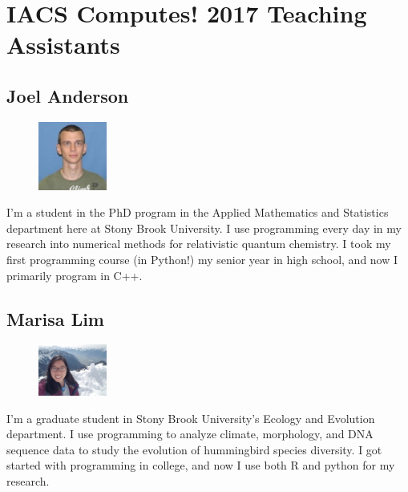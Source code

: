 \documentclass[]{article}
\begin{document}
\section*{IACS Computes! 2017 Teaching Assistants}

\subsection*{Joel Anderson} 
\begin{figure}
\begin{centering}
    \includegraphics[width=0.2\textwidth]{joel.jpg}
\end{centering}
\end{figure}
I'm a student in the PhD program in the Applied Mathematics and Statistics department here at Stony Brook University. I use programming every day in my research into numerical methods for relativistic quantum chemistry. I took my first programming course (in Python!) my senior year in high school, and now I primarily program in C++.

\subsection*{Marisa Lim} 
\begin{figure}
\begin{centering}
    \includegraphics[width=0.2\textwidth]{marisa.jpg}
\end{centering}
\end{figure}
I'm a graduate student in Stony Brook University's Ecology and Evolution department. I use programming to analyze climate, morphology, and DNA sequence data to study the evolution of hummingbird species diversity. I got started with programming in college, and now I use both R and python for my research.
\end{document}
